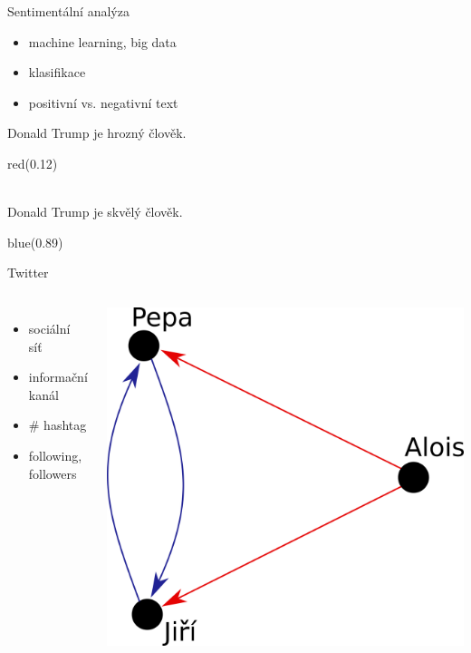 \documentclass[notheorems,12pt]{beamer}
\begin{document}
\begin{frame}{Sentimentální analýza}
\begin{itemize}
    \item machine learning, big data
    \item klasifikace
    \item positivní vs. negativní text
\end{itemize}
\center
Donald Trump je hrozný člověk.\\
\begin{color}{red}(0.12)\end{color}\\
\vspace{0.5cm}
Donald Trump je skvělý člověk.\\
\begin{color}{blue}(0.89)\end{color}
\end{frame}
\begin{frame}{Twitter}
    \begin{columns}
    \column{5cm}
    	\begin{itemize}
    		\item sociální síť
    		\item informační kanál
    		\item \# hashtag
    		\item following, followers
    	\end{itemize}
    \column{6cm}
    	\center
    	\includegraphics[scale=0.35]{./Pics/pepa.png}
    \end{columns}
\end{frame}
\end{document}
